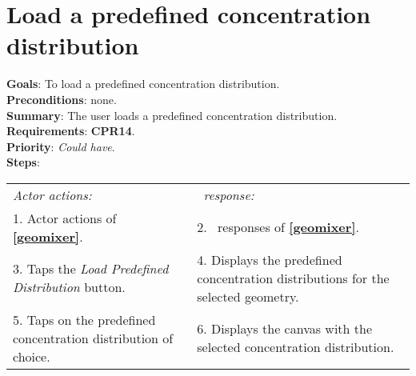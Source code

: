   \section{Load a predefined concentration distribution}
  \label{loadpreddist}
  \textbf{Goals}: To load a predefined concentration distribution.\\
  \textbf{Preconditions}: none.\\
  \textbf{Summary}: The user loads a predefined concentration distribution.\\
  \textbf{Requirements}: \textbf{CPR14}.\\
  \textbf{Priority}: \emph{Could have}.\\
  \textbf{Steps}: \\
  \begin{tabular}{ p{} p{} }
  	\emph{Actor actions:} & \emph{\projectname\ response:} \\
  	1. Actor actions of \textbf{\ref{geomixer}}. & 2. \projectname\ responses of \textbf{\ref{geomixer}}. \\
	3. Taps the \emph{Load Predefined Distribution} button. & 4. Displays the predefined concentration distributions for the selected geometry. \\
	5. Taps on the predefined concentration distribution of choice. & 6. Displays the canvas with the selected concentration distribution. \\
  \end{tabular}

